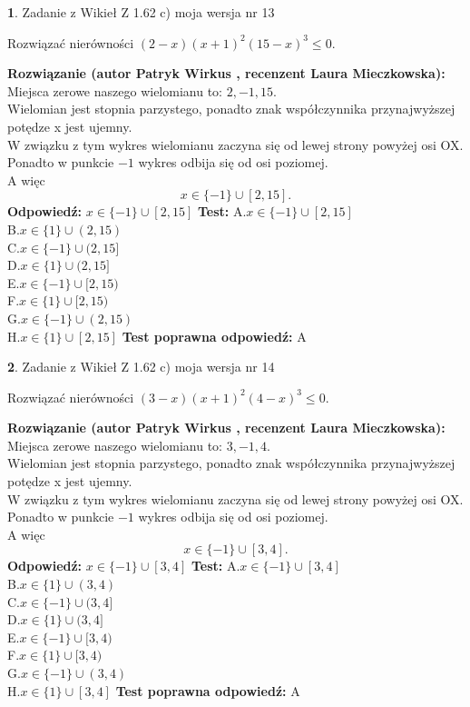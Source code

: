 \documentclass[12pt, a4paper]{article}
\theoremstyle{definition} %
\newtheorem{zad}{}
\newcommand{\zadStart}[1]{\begin{zad}#1\newline}
\newcommand{\zadStop}{\end{zad}}
\newcommand{\rozwStart}[2]{\noindent \textbf{Rozwiązanie (autor #1 , recenzent #2): }\newline}
\newcommand{\rozwStop}{\newline}
\newcommand{\odpStart}{\noindent \textbf{Odpowiedź:}\newline}
\newcommand{\odpStop}{\newline}
\newcommand{\testStart}{\noindent \textbf{Test:}\newline}
\newcommand{\testStop}{\newline}
\newcommand{\kluczStart}{\noindent \textbf{Test poprawna odpowiedź:}\newline}
\newcommand{\kluczStop}{\newline}
\begin{document}
\zadStart{Zadanie z Wikieł Z 1.62 c) moja wersja nr 13}

Rozwiązać nierówności $(2-x)(x+1)^{2}(15-x)^{3}\le0$.
\zadStop
\rozwStart{Patryk Wirkus}{Laura Mieczkowska}
Miejsca zerowe naszego wielomianu to: $2, -1, 15$.\\
Wielomian jest stopnia parzystego, ponadto znak współczynnika przy\linebreak najwyższej potędze x jest ujemny.\\ W związku z tym wykres wielomianu zaczyna się od lewej strony powyżej osi OX.\\
Ponadto w punkcie $-1$ wykres odbija się od osi poziomej.\\
A więc $$x \in \{-1\} \cup [2,15].$$
\rozwStop
\odpStart
$x \in \{-1\} \cup [2,15]$
\odpStop
\testStart
A.$x \in \{-1\} \cup [2,15]$\\
B.$x \in \{1\} \cup (2,15)$\\
C.$x \in \{-1\} \cup (2,15]$\\
D.$x \in \{1\} \cup (2,15]$\\
E.$x \in \{-1\} \cup [2,15)$\\
F.$x \in \{1\} \cup [2,15)$\\
G.$x \in \{-1\} \cup (2,15)$\\
H.$x \in \{1\} \cup [2,15]$
\testStop
\kluczStart
A
\kluczStop



\zadStart{Zadanie z Wikieł Z 1.62 c) moja wersja nr 14}

Rozwiązać nierówności $(3-x)(x+1)^{2}(4-x)^{3}\le0$.
\zadStop
\rozwStart{Patryk Wirkus}{Laura Mieczkowska}
Miejsca zerowe naszego wielomianu to: $3, -1, 4$.\\
Wielomian jest stopnia parzystego, ponadto znak współczynnika przy\linebreak najwyższej potędze x jest ujemny.\\ W związku z tym wykres wielomianu zaczyna się od lewej strony powyżej osi OX.\\
Ponadto w punkcie $-1$ wykres odbija się od osi poziomej.\\
A więc $$x \in \{-1\} \cup [3,4].$$
\rozwStop
\odpStart
$x \in \{-1\} \cup [3,4]$
\odpStop
\testStart
A.$x \in \{-1\} \cup [3,4]$\\
B.$x \in \{1\} \cup (3,4)$\\
C.$x \in \{-1\} \cup (3,4]$\\
D.$x \in \{1\} \cup (3,4]$\\
E.$x \in \{-1\} \cup [3,4)$\\
F.$x \in \{1\} \cup [3,4)$\\
G.$x \in \{-1\} \cup (3,4)$\\
H.$x \in \{1\} \cup [3,4]$
\testStop
\kluczStart
A
\kluczStop
\end{document}
